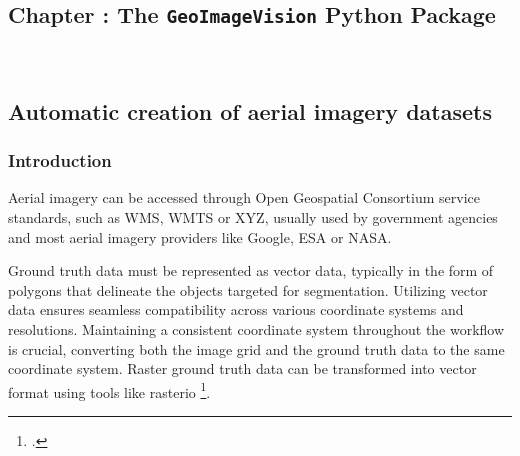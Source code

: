 \graphicspath{
    {figures_and_references/urban_surface_detection/}
    {figures_and_references/EELISA_conference/}
}

\renewcommand{\chapternametext}{Chapter \thechapter: The \texttt{GeoImageVision} Python Package}

\begin{refsection}

\chapter{\chapternametext}
\

\renewcommand{\headingtextL}{}
\renewcommand{\headingtextR}{\chapternametext}
\begingroup
 \flushbottom
 \setlength{\parskip}{0pt plus 1fil}%
 \localtableofcontents 
\endgroup

\begingroup
 \flushbottom
 \setlength{\parskip}{0pt plus 1fil}%
 \locallistoffigures
\endgroup


\newpage

\setcounter{section}{0} 



\FloatBarrier

\renewcommand{\sectionnametext}{Automatic creation of aerial imagery datasets}
\renewcommand{\headingtextL}{\chapternametext}
\renewcommand{\headingtextR}{\thesection. \sectionnametext}
\section{\sectionnametext}

\subsection{Introduction}

Aerial imagery can be accessed through Open Geospatial Consortium service standards, such as WMS, WMTS or XYZ, usually used by government agencies and most aerial imagery providers like Google, ESA or NASA.


Ground truth data must be represented as vector data, typically in the form of polygons that delineate the objects targeted for segmentation.  Utilizing vector data ensures seamless compatibility across various coordinate systems and resolutions.  Maintaining a consistent coordinate system throughout the workflow is crucial, converting both the image grid and the ground truth data to the same coordinate system. Raster ground truth data can be transformed into vector format using tools like rasterio \footcite{gillies_rasterio_2013}. 



\end{refsection}
